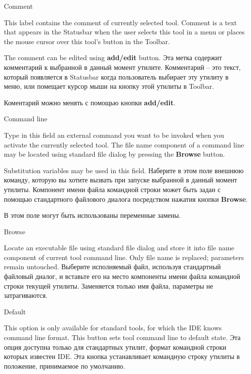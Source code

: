 \begin{popup}
\caption{Comment}

\ifenglish
This label contains the comment of currently selected tool.
Comment is a text that appears in the Statusbar when the user selects this
tool in a menu or places the mouse cursor over this tool's button in the Toolbar.

The comment can be edited using {\bf add/edit} button.
 \else
Эта метка содержит комментарий к выбранной в данный момент утилите. 
Комментарий -- это текст, который появляется в Statusbar когда пользователь 
выбирает эту утилиту в меню, или помещает курсор мыши на кнопку этой утилиты в
Toolbar. 

Коментарий можно менять с помощью кнопки {\bf add/edit}.
\fi
\end{popup}

\begin{popup}
\caption{Command line}

\ifenglish
Type in this field an external  command you want to be invoked when
you activate the currently selected tool. The file name component of
a command line may be located using standard file dialog by pressing the
{\bf Browse} button.

Substitution variables may be used in this field.
 \else
Наберите в этом поле внешнюю команду, которую вы хотите вызвать при запуске
выбранной в данный момент утилиты. Компонент имени файла командной строки
может быть задан с помощью стандартного файлового диалога посредством нажатия 
кнопки {\bf Browse}.

В этом поле могут быть использованы переменные замены.
\fi
\end{popup}

\begin{popup}
\caption{Browse}

\ifenglish
Locate an executable file using standard file dialog and store it into
file name component of current tool command line. Only file name is
replaced; parameters remain untouched.
 \else
Выберите исполняемый файл, используя стандартный файловый диалог, и вставьте
его на место компоненты имени файла командной строки текущей утилиты. Заменяется
только имя файла, параметры не затрагиваются. 
\fi
\end{popup}

\begin{popup}
\caption{Default}

\ifenglish
This option is only available for standard tools, for which the IDE knows
command line format. This button sets tool command line to default state.
 \else
Эта опция доступна только для стандартных утилит, формат командной строки 
которых известен IDE. Эта кнопка устанавливает командную строку утилиты в 
положение, принимаемое по умолчанию. 
\fi
\end{popup}

